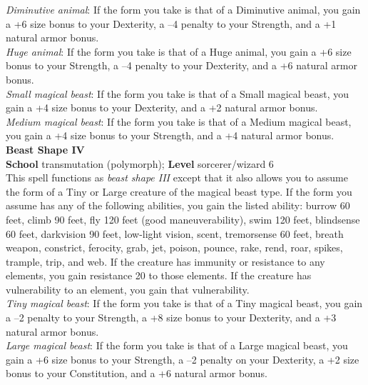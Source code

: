 \textit{Diminutive animal}: If the form you take is that of a Diminutive animal, you gain a +6 size bonus to your Dexterity, a --4 penalty to your Strength, and a +1 natural armor bonus.\\
\textit{Huge animal}: If the form you take is that of a Huge animal, you gain a +6 size bonus to your Strength, a --4 penalty to your Dexterity, and a +6 natural armor bonus.\\
\textit{Small magical beast}: If the form you take is that of a Small magical beast, you gain a +4 size bonus to your Dexterity, and a +2 natural armor bonus.\\
\textit{Medium magical beast}: If the form you take is that of a Medium magical beast, you gain a +4 size bonus to your Strength, and a +4 natural armor bonus.\\
\textbf{Beast Shape IV}\\
\textbf{School }transmutation (polymorph); \textbf{Level }sorcerer/wizard 6\\
This spell functions as \textit{beast shape III }except that it also allows you to assume the form of a Tiny or Large creature of the magical beast type. If the form you assume has any of the following abilities, you gain the listed ability: burrow 60 feet, climb 90 feet, fly 120 feet (good maneuverability), swim 120 feet, blindsense 60 feet, darkvision 90 feet, low-light vision, scent, tremorsense 60 feet, breath weapon, constrict, ferocity, grab, jet, poison, pounce, rake, rend, roar, spikes, trample, trip, and web. If the creature has immunity or resistance to any elements, you gain resistance 20 to those elements. If the creature has vulnerability to an element, you gain that vulnerability.\\
\textit{Tiny magical beast}: If the form you take is that of a Tiny magical beast, you gain a --2 penalty to your Strength, a +8 size bonus to your Dexterity, and a +3 natural armor bonus.\\
\textit{Large magical beast}: If the form you take is that of a Large magical beast, you gain a +6 size bonus to your Strength, a --2 penalty on your Dexterity, a +2 size bonus to your Constitution, and a +6 natural armor bonus.\\
